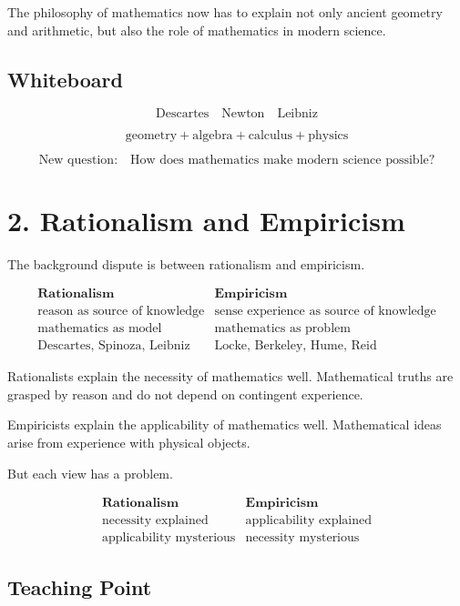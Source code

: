 \documentclass[11pt]{article}
\begin{document}
The philosophy of mathematics now has to explain not only ancient geometry and
arithmetic, but also the role of mathematics in modern science.

\subsection*{Whiteboard}

\[
\text{Descartes}
\quad
\text{Newton}
\quad
\text{Leibniz}
\]

\[
\text{geometry} + \text{algebra} + \text{calculus} + \text{physics}
\]

\[
\text{New question:}
\quad
\text{How does mathematics make modern science possible?}
\]

\section*{2. Rationalism and Empiricism}

The background dispute is between rationalism and empiricism.

\[
\begin{array}{c|c}
\textbf{Rationalism} & \textbf{Empiricism} \\
\hline
\text{reason as source of knowledge} &
\text{sense experience as source of knowledge} \\
\text{mathematics as model} &
\text{mathematics as problem} \\
\text{Descartes, Spinoza, Leibniz} &
\text{Locke, Berkeley, Hume, Reid}
\end{array}
\]

Rationalists explain the necessity of mathematics well. Mathematical truths are grasped
by reason and do not depend on contingent experience.

Empiricists explain the applicability of mathematics well. Mathematical ideas arise from
experience with physical objects.

But each view has a problem.

\[
\begin{array}{c|c}
\textbf{Rationalism} & \textbf{Empiricism} \\
\hline
\text{necessity explained} & \text{applicability explained} \\
\text{applicability mysterious} & \text{necessity mysterious}
\end{array}
\]

\subsection*{Teaching Point}
\end{document}
